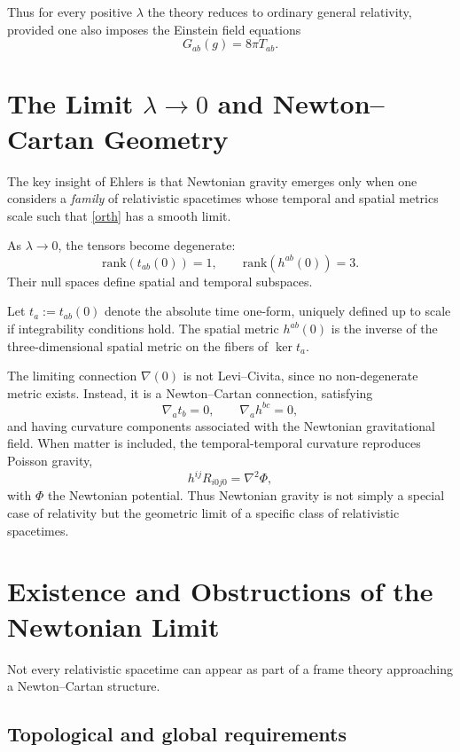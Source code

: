 \documentclass[12pt]{article}
\begin{document}
Thus for every positive $\lambda$ the theory reduces to ordinary general
relativity, provided one also imposes the Einstein field equations
\begin{equation}
  G_{ab}(g) = 8\pi T_{ab}.
\end{equation}

\section{The Limit $\lambda\to 0$ and Newton--Cartan Geometry}

The key insight of Ehlers is that Newtonian gravity emerges only when one
considers a \emph{family} of relativistic spacetimes whose temporal and spatial
metrics scale such that \eqref{orth} has a smooth limit.

As $\lambda\to 0$, the tensors become degenerate:
\[
\mathrm{rank}( t_{ab}(0) ) = 1, 
\qquad 
\mathrm{rank}( h^{ab}(0) ) = 3.
\]
Their null spaces define spatial and temporal subspaces.

Let $t_a := t_{ab}(0)$ denote the absolute time one-form, uniquely defined up
to scale if integrability conditions hold.
The spatial metric $h^{ab}(0)$ is the inverse of the three-dimensional spatial
metric on the fibers of $\ker t_a$.

The limiting connection $\nabla(0)$ is not Levi--Civita, since no non-degenerate
metric exists.
Instead, it is a Newton--Cartan connection, satisfying
\[
\nabla_a t_b = 0, \qquad \nabla_a h^{bc} = 0,
\]
and having curvature components associated with the Newtonian gravitational
field.
When matter is included, the temporal-temporal curvature reproduces Poisson
gravity,
\begin{equation}
  h^{ij} R_{i0j0} = \nabla^2 \Phi,
\end{equation}
with $\Phi$ the Newtonian potential.
Thus Newtonian gravity is not simply a special case of relativity but the
geometric limit of a specific class of relativistic spacetimes.

\section{Existence and Obstructions of the Newtonian Limit}

Not every relativistic spacetime can appear as part of a frame theory
approaching a Newton--Cartan structure.

\subsection{Topological and global requirements}
\end{document}
